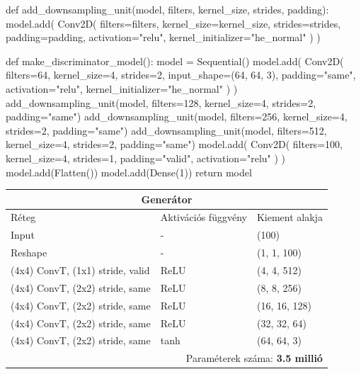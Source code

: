 \begin{python}
def add_downsampling_unit(model, filters,
                          kernel_size, strides, padding):
    model.add(
        Conv2D(
            filters=filters, kernel_size=kernel_size,
            strides=strides, padding=padding, activation="relu",
            kernel_initializer="he_normal"
        )
    )

def make_discriminator_model():
    model = Sequential()
    model.add(
        Conv2D(
            filters=64, kernel_size=4, strides=2,
            input_shape=(64, 64, 3),
            padding="same", activation="relu",
            kernel_initializer="he_normal"
        )
    )
    add_downsampling_unit(model, filters=128,
                          kernel_size=4, strides=2, padding="same")
    add_downsampling_unit(model, filters=256,
                          kernel_size=4, strides=2, padding="same")
    add_downsampling_unit(model, filters=512,
                          kernel_size=4, strides=2, padding="same")
    model.add(
        Conv2D(
            filters=100, kernel_size=4, strides=1, padding="valid",
            activation="relu"
        )
    )
    model.add(Flatten())
    model.add(Dense(1))
    return model
\end{python}

\begin{tabular}{ |p{6cm}||p{4cm}|p{3cm}|  }
	\hline
	\multicolumn{3}{|c|}{\textbf{Generátor}} \\
	\hline
	Réteg & Aktivációs függvény & Kiement alakja\\
	\hline
	Input & - & (100)\\
	Reshape & - & (1, 1, 100)\\
	(4x4) ConvT, (1x1) stride, valid & ReLU & (4, 4, 512)\\
	(4x4) ConvT, (2x2) stride, same & ReLU & (8, 8, 256)\\
	(4x4) ConvT, (2x2) stride, same & ReLU & (16, 16, 128)\\
	(4x4) ConvT, (2x2) stride, same & ReLU & (32, 32, 64)\\
	(4x4) ConvT, (2x2) stride, same & tanh & (64, 64, 3)\\
	\hline
	\multicolumn{3}{|r|}{Paraméterek száma: \textbf{3.5 millió}} \\
	\hline
\end{tabular}


